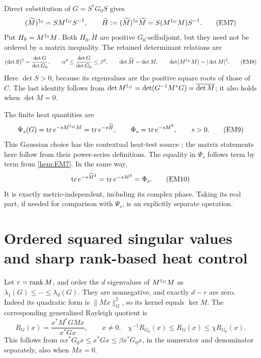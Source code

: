Direct substitution of \(G=S^*G_0S\) gives
\begin{equation}
 (\widetilde M)^{\dagger_0}=S M^{\dagger_G}S^{-1},\qquad
 \widetilde H:=(\widetilde M)^{\dagger_0}\widetilde M
     =S(M^{\dagger_G}M)S^{-1}.
 \tag{EM7}\label{hem:EM7}
\end{equation}
Put \(H_0=M^{\dagger_0}M\). Both \(H_0,\widetilde H\) are positive
\(G_0\)-selfadjoint, but they need not be ordered by a matrix inequality.
The retained determinant relations are
\begin{equation}
 (\det S)^2=\frac{\det G}{\det G_0},\qquad
 \alpha^d\le\frac{\det G}{\det G_0}\le\beta^d,\qquad
 \det\widetilde M=\det M,\qquad
 \det(M^{\dagger_G}M)=|\det M|^2.
 \tag{EM8}\label{hem:EM8}
\end{equation}
Here \(\det S>0\), because its eigenvalues are the positive square roots
of those of \(C\). The last identity follows from
\(\det M^{\dagger_G}=\det(G^{-1}M^*G)=\overline{\det M}\);
it also holds when \(\det M=0\).

The finite heat quantities are
\begin{equation}
 \Psi_s(G)=\operatorname{tr} e^{-sM^{\dagger_G}M}
          =\operatorname{tr} e^{-s\widetilde H},\qquad
 \Phi_s=\operatorname{tr} e^{-sM^2},\qquad s>0.
 \tag{EM9}\label{hem:EM9}
\end{equation}
This Gaussian choice has the contextual heat-test source
\cite[original-source formula \texttt{ft}]{hem:ConnesHeat}; the matrix
statements here follow from their power-series definitions.
The equality in \(\Psi_s\) follows term by term from \eqref{hem:EM7}.
In the same way,
\begin{equation}
 \operatorname{tr} e^{-s\widetilde M^2}=\operatorname{tr} e^{-sM^2}=\Phi_s.
 \tag{EM10}\label{hem:EM10}
\end{equation}
It is exactly metric-independent, including its complex phase. Taking its
real part, if needed for comparison with \(\Psi_s\), is an explicitly
separate operation.

\section{Ordered squared singular values and sharp rank-based heat control}

Let \(r=\operatorname{rank} M\), and order the \(d\) eigenvalues of \(M^{\dagger_G}M\) as
\(\lambda_1(G)\le\cdots\le\lambda_d(G)\). They are nonnegative, and
exactly \(d-r\) are zero. Indeed its quadratic form is
\(\|Mx\|_G^2\), so its kernel equals \(\ker M\).
The corresponding generalized Rayleigh quotient is
\begin{equation}
 R_G(x)=\frac{x^*M^*GMx}{x^*Gx},\qquad x\ne0.
 \quad
 \chi^{-1}R_{G_0}(x)\le R_G(x)\le\chi R_{G_0}(x).
 \tag{EM11}\label{hem:EM11}
\end{equation}
This follows from
\(\alpha x^*G_0x\le x^*Gx\le\beta x^*G_0x\), in the numerator and
denominator separately, also when \(Mx=0\).

